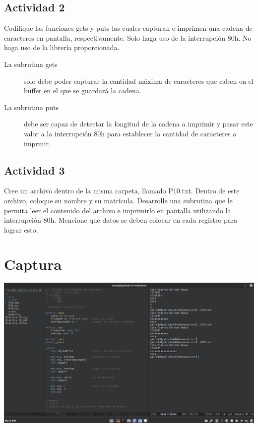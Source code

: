 \documentclass[12pt]{article}
\begin{document}
\subsection*{Actividad 2}
\label{sec:org698e968}
Codifique las funciones gets y puts las cuales capturan e imprimen una 
cadena de caracteres en pantalla, respectivamente. Solo haga uso de la 
interrupción 80h. No haga uso de la librería proporcionada.

\begin{description}
\item[{La subrutina gets}] solo debe poder capturar la cantidad máxima de caracteres que caben en el buffer en el que se guardará la cadena.

\item[{La subrutina puts}] debe ser capaz de detectar la longitud de la cadena a imprimir y pasar este valor a la interrupción 80h para establecer la cantidad de  caracteres a imprmir.
\end{description}

\subsection*{Actividad 3}
\label{sec:org7f96cff}
Cree un archivo dentro de la misma carpeta, llamado P10.txt. Dentro de
este archivo, coloque su nombre y su matrícula. Desarrolle una subrutina
que le permita leer el contenido del archivo e imprimirlo en pantalla
utilizando la interrupción 80h. Mencione que datos se deben colocar en
cada registro para lograr esto. 

\section*{Captura}
\label{sec:orga09ddd2}
\begin{center}
\includegraphics[width=.9\linewidth]{img/a.png}
\end{center}
\end{document}
